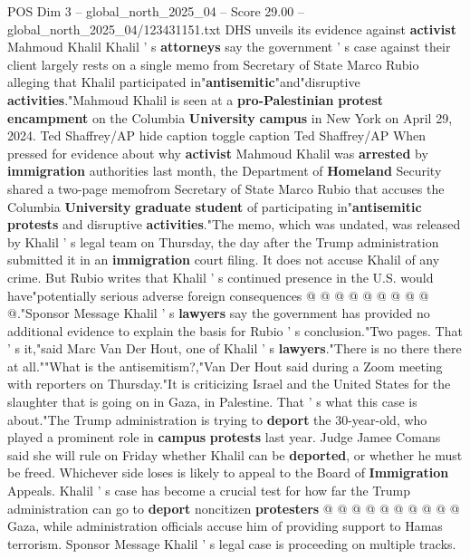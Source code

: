\begin{textsample}{POS Dim 3 – global\_north\_2025\_04 – Score 29.00 – global\_north\_2025\_04/123431151.txt}  \label{ex:f3_pos_059}
DHS unveils its evidence against \textbf{activist} Mahmoud Khalil Khalil ' s \textbf{attorneys} say the government ' s case against their client largely rests on a single memo from Secretary of State Marco Rubio alleging that Khalil participated in"\textbf{antisemitic}"and"disruptive \textbf{activities}."Mahmoud Khalil is seen at a \textbf{pro-Palestinian} \textbf{protest} \textbf{encampment} on the Columbia \textbf{University} \textbf{campus} in New York on April 29, 2024.
Ted Shaffrey/AP hide caption toggle caption Ted Shaffrey/AP When pressed for evidence about why \textbf{activist} Mahmoud Khalil was \textbf{arrested} by \textbf{immigration} authorities last month, the Department of \textbf{Homeland} Security shared a two-page memofrom Secretary of State Marco Rubio that accuses the Columbia \textbf{University} \textbf{graduate} \textbf{student} of participating in"\textbf{antisemitic} \textbf{protests} and disruptive \textbf{activities}."The memo, which was undated, was released by Khalil ' s legal team on Thursday, the day after the Trump administration submitted it in an \textbf{immigration} court filing.
It does not accuse Khalil of any crime.
But Rubio writes that Khalil ' s continued presence in the U.S. would have"potentially serious adverse foreign consequences @ @ @ @ @ @ @ @ @ @."Sponsor Message Khalil ' s \textbf{lawyers} say the government has provided no additional evidence to explain the basis for Rubio ' s conclusion."Two pages.
That ' s it,"said Marc Van Der Hout, one of Khalil ' s \textbf{lawyers}."There is no there there at all.""What is the antisemitism?,"Van Der Hout said during a Zoom meeting with reporters on Thursday."It is criticizing Israel and the United States for the slaughter that is going on in Gaza, in Palestine.
That ' s what this case is about."The Trump administration is trying to \textbf{deport} the 30-year-old, who played a prominent role in \textbf{campus} \textbf{protests} last year.
Judge Jamee Comans said she will rule on Friday whether Khalil can be \textbf{deported}, or whether he must be freed.
Whichever side loses is likely to appeal to the Board of \textbf{Immigration} Appeals.
Khalil ' s case has become a crucial test for how far the Trump administration can go to \textbf{deport} noncitizen \textbf{protesters} @ @ @ @ @ @ @ @ @ @ Gaza, while administration officials accuse him of providing support to Hamas terrorism.
Sponsor Message Khalil ' s legal case is proceeding on multiple tracks.

\end{textsample}
